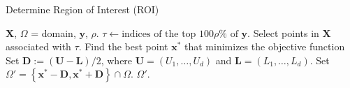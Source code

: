 \documentclass{beamer}
\newcommand{\X}{\boldsymbol{X}}
\newcommand{\x}{\boldsymbol{x}}
\newcommand{\y}{\boldsymbol{y}}
\begin{document}
\begin{frame}
\begin{algorithm}[H]
    \caption{Determine Region of Interest (ROI)}\label{alg:roi}
    \begin{algorithmic}[1]
        \Require $\X$, $\Omega$ = domain, $\y$, $\rho$.
        \State $\tau \gets \text{indices of the top } 100\rho\% \text{ of } \y$.
        \State Select points in $\X$ associated with $\tau$.
        \State Find the best point $\x^*$ that minimizes the objective function  %
        \State Set $\mathbf{D} := (\mathbf{U} - \mathbf{L})/2$, where $\mathbf{U}=(U_1, \ldots, U_d)$ and $\mathbf{L}=(L_1, \ldots, L_d)$.
        \State Set {$\Omega' =  \left\{\x^* - \mathbf{D},  \x^* + \mathbf{D} \right\} \cap \Omega$.}
        \State \Return $\Omega'$.
    \end{algorithmic}
\end{algorithm}

\end{frame}
\end{document}
